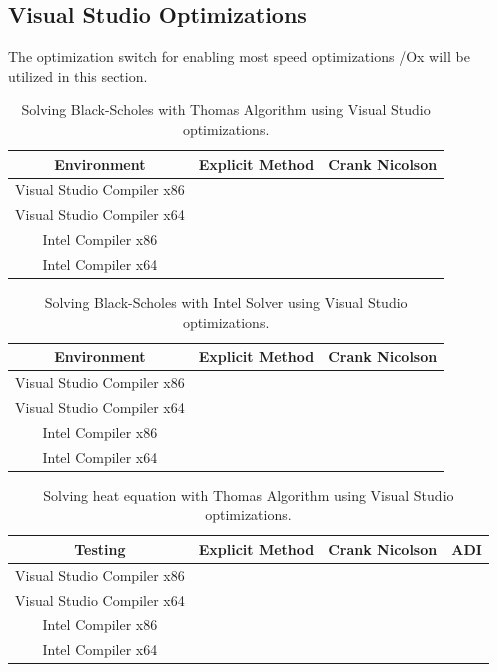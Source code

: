 \documentclass[12pt, oneside]{book}
\theoremstyle{plain}
\theoremstyle{definition}
\begin{document}
\subsection{Visual Studio Optimizations} 
 The optimization switch for enabling most speed optimizations /Ox will be utilized in this section. 
\begin{table}[h!]
\centering
 \begin{tabular}{||c c c||} 
 \hline
 Environment & Explicit Method & Crank Nicolson\\ [0.5ex] 
 \hline\hline\hline
 Visual Studio Compiler x86 & \\ 
 Visual Studio Compiler x64 & \\
 Intel Compiler x86 & \\
 Intel Compiler x64 & \\ [1ex] 
 \hline
 \end{tabular}
 \caption{Solving Black-Scholes with Thomas Algorithm using Visual Studio optimizations.}
\end{table}

\begin{table}[h!]
\centering
 \begin{tabular}{||c c c||} 
 \hline
 Environment & Explicit Method & Crank Nicolson\\ [0.5ex] 
 \hline\hline\hline
 Visual Studio Compiler x86 & \\ 
 Visual Studio Compiler x64 & \\
 Intel Compiler x86 & \\
 Intel Compiler x64 & \\ [1ex] 
 \hline
 \end{tabular}
 \caption{Solving Black-Scholes with Intel Solver using Visual Studio optimizations.}
\end{table}

\begin{table}[htp!]
\centering
 \begin{tabular}{||c c c c||} 
 \hline
 Testing & Explicit Method & Crank Nicolson & ADI\\ [0.5ex] 
 \hline\hline\hline
 Visual Studio Compiler x86 \\ 
 Visual Studio Compiler x64 & \\
 Intel Compiler x86 & \\
 Intel Compiler x64 & \\[1ex] 
 \hline
 \end{tabular}
 \caption{Solving heat equation with Thomas Algorithm using Visual Studio optimizations.}
\end{table}
 
\end{document}
